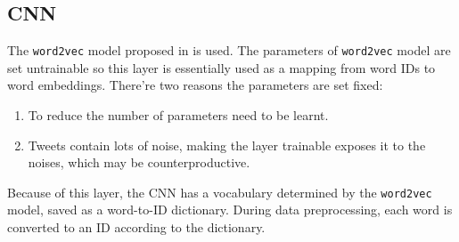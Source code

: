 \subsection{CNN}
The {\tt word2vec} model proposed in \cite{} is used. The parameters of {\tt word2vec} model are set untrainable so this layer is essentially used as a mapping from word IDs to word embeddings. There're two reasons the parameters are set fixed:
\begin{enumerate}
\item To reduce the number of parameters need to be learnt.
\item Tweets contain lots of noise, making the layer trainable exposes it to the noises, which may be counterproductive.
\end{enumerate}
Because of this layer, the CNN has a vocabulary determined by the {\tt word2vec} model, saved as a word-to-ID dictionary. During data preprocessing, each word is converted to an ID according to the dictionary.